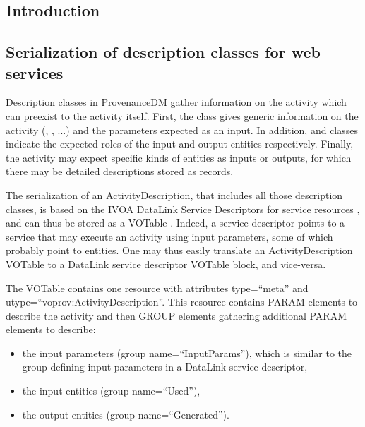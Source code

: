 \subsection{Introduction}
\label{sec:intro-serialization}


\subsection{Serialization of description classes for web services}
\label{sec:description-serialization}


Description classes in ProvenanceDM gather information on the activity which can preexist to the activity itself.
First, the  class gives generic information on the activity (, , ...) and the parameters expected as an input. In addition,  and  classes indicate the expected roles of the input and output entities respectively. Finally, the activity may expect specific kinds of entities as inputs or outputs, for which there may be detailed descriptions stored as  records.

The serialization of an ActivityDescription, that includes all those description classes, is based on the IVOA DataLink Service Descriptors for service resources \citep{std:Datalink}, and can thus be stored as a VOTable \citep{std:VOTABLE}. Indeed, a service descriptor points to a service that may execute an activity using input parameters, some of which probably point to entities. One may thus easily translate an ActivityDescription VOTable to a DataLink service descriptor VOTable block, and vice-versa.

The VOTable contains one resource with attributes type=``meta'' and utype=``voprov:ActivityDescription''. This resource contains PARAM elements to describe the activity and then GROUP elements gathering additional PARAM elements to describe:
\begin{itemize}
 \item the input parameters (group name=``InputParams''), which is similar to the group defining input parameters in a DataLink service descriptor,
 \item the input entities (group name=``Used''),
 \item the output entities (group name=``Generated''). 
 \end{itemize}
 
